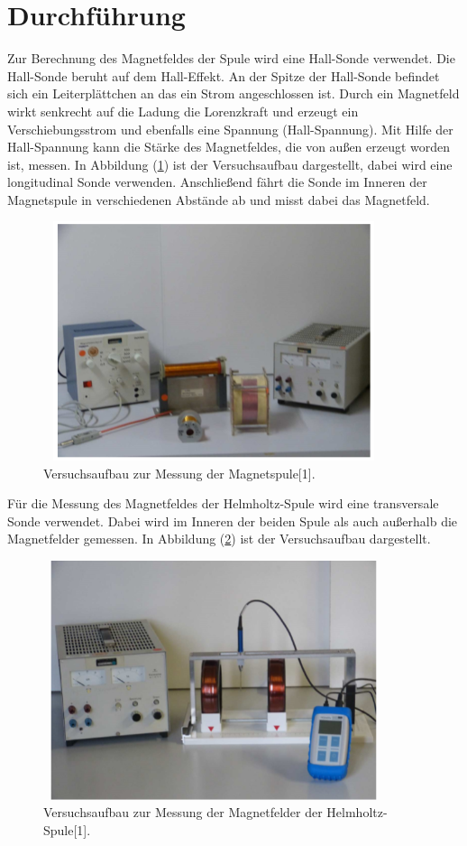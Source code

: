 \section{Durchführung}
Zur Berechnung des Magnetfeldes der Spule wird eine Hall-Sonde verwendet.
Die Hall-Sonde beruht auf dem Hall-Effekt. An der Spitze der Hall-Sonde befindet sich
ein Leiterplättchen an das ein Strom angeschlossen ist. Durch ein Magnetfeld wirkt senkrecht
auf die Ladung die Lorenzkraft und erzeugt ein Verschiebungsstrom und ebenfalls eine Spannung (Hall-Spannung).
Mit Hilfe der Hall-Spannung kann die Stärke des Magnetfeldes, die von außen erzeugt worden ist, messen.
In Abbildung (\ref{abb:4}) ist der Versuchsaufbau dargestellt, dabei wird eine longitudinal Sonde verwenden.
Anschließend fährt die Sonde im Inneren der Magnetspule in verschiedenen Abstände ab und misst dabei das
Magnetfeld.
\begin{figure}[H]
  \centering
  \includegraphics[width=10cm, height= 7cm]{Abb4.png}
  \caption{Versuchsaufbau zur Messung der Magnetspule[1].}
  \label{abb:4}
\end{figure}
Für die Messung des Magnetfeldes der Helmholtz-Spule wird eine transversale Sonde verwendet.
Dabei wird im Inneren der beiden Spule als auch außerhalb die Magnetfelder gemessen.
In Abbildung (\ref{abb:5}) ist der Versuchsaufbau dargestellt.
\begin{figure}[H]
  \centering
  \includegraphics[width=10cm, height= 7cm]{Abb5.png}
  \caption{Versuchsaufbau zur Messung der Magnetfelder der Helmholtz-Spule[1].}
  \label{abb:5}
\end{figure}
